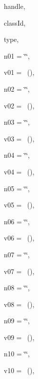{\begin{DoxyParamCaption}
\item[{uint16\+\_\+t}]{handle, }
\item[{uint16\+\_\+t}]{class\+Id, }
\item[{std\+::string}]{type, }
\item[{std\+::string}]{n01 = {\ttfamily \char`\"{}\char`\"{}}, }
\item[{const {\bf Attribute\+Value} \&}]{v01 = {~()}, }
\item[{std\+::string}]{n02 = {\ttfamily \char`\"{}\char`\"{}}, }
\item[{const {\bf Attribute\+Value} \&}]{v02 = {~()}, }
\item[{std\+::string}]{n03 = {\ttfamily \char`\"{}\char`\"{}}, }
\item[{const {\bf Attribute\+Value} \&}]{v03 = {~()}, }
\item[{std\+::string}]{n04 = {\ttfamily \char`\"{}\char`\"{}}, }
\item[{const {\bf Attribute\+Value} \&}]{v04 = {~()}, }
\item[{std\+::string}]{n05 = {\ttfamily \char`\"{}\char`\"{}}, }
\item[{const {\bf Attribute\+Value} \&}]{v05 = {~()}, }
\item[{std\+::string}]{n06 = {\ttfamily \char`\"{}\char`\"{}}, }
\item[{const {\bf Attribute\+Value} \&}]{v06 = {~()}, }
\item[{std\+::string}]{n07 = {\ttfamily \char`\"{}\char`\"{}}, }
\item[{const {\bf Attribute\+Value} \&}]{v07 = {~()}, }
\item[{std\+::string}]{n08 = {\ttfamily \char`\"{}\char`\"{}}, }
\item[{const {\bf Attribute\+Value} \&}]{v08 = {~()}, }
\item[{std\+::string}]{n09 = {\ttfamily \char`\"{}\char`\"{}}, }
\item[{const {\bf Attribute\+Value} \&}]{v09 = {~()}, }
\item[{std\+::string}]{n10 = {\ttfamily \char`\"{}\char`\"{}}, }
\item[{const {\bf Attribute\+Value} \&}]{v10 = {~()}, }

\end{DoxyParamCaption}}
